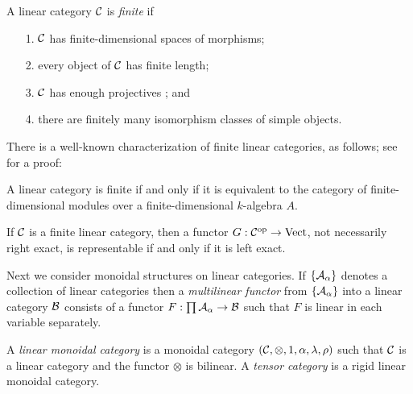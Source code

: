\documentclass{amsart}
\begin{document}
\begin{definition} %
	A linear category $\mathcal C$ is {\em finite} if 
	\begin{enumerate}
		\item[1.] $\mathcal C$ has finite-dimensional spaces of morphisms;
		\item[2.] every object of $\mathcal C$ has finite length;
		\item[3.] $\mathcal C$ has enough projectives%
		; and
		\item[4.] there are finitely many isomorphism classes of simple objects.  
	\end{enumerate}
\end{definition}

There is a well-known characterization of finite linear categories, as follows; see~\cite{BTP} for a proof:
\begin{proposition} \label{prop:catismod}
A linear category is finite if and only if it is equivalent to the category of finite-dimensional modules over a finite-dimensional $k$-algebra $A$.
\end{proposition}

\begin{lemma} \label{lma:left_exact=linear}
	If $\mathcal C$ is a finite linear category, then a  functor $G: \mathcal C^{\mathrm{op}} \to \mathrm{Vect}$, not necessarily right exact, is representable if and only if it is left exact. 
\end{lemma}

	
Next we consider monoidal structures on linear categories.	
If $\{\mathcal A_\alpha\}$ denotes a collection of linear categories then a {\em multilinear functor} from $\{\mathcal A_\alpha\}$ into a linear category $\mathcal B$ consists of a functor
$F: \prod \mathcal A_\alpha \to \mathcal B$
such that $F$ is linear in each variable separately. 

\begin{definition}
	A {\em linear monoidal category} is a monoidal category $(\mathcal C, \otimes, 1, \alpha, \lambda, \rho)$ such that $\mathcal C$ is a linear category and the functor $\otimes$ is bilinear. A {\em tensor category} is a rigid linear monoidal category.  
\end{definition}
\end{document}
